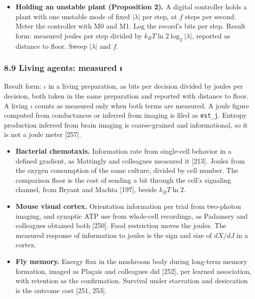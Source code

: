 \documentclass[
  10pt,
]{article}
\providecommand{\tightlist}{%
  \setlength{\itemsep}{0pt}\setlength{\parskip}{0pt}}
\begin{document}
\begin{itemize}
\begin{itemize}
    detector repeats the protocol, with \(\langle A\rangle\) counted
    jump by jump {[}70{]}. Agreement on two substrates is the test.
  \item
    All work is computed from trajectories and filed as
    \texttt{trajectory\_j}.
  \end{itemize}
\item
  \textbf{Holding an unstable plant (Proposition 2).} A digital
  controller holds a plant with one unstable mode of fixed \(|\lambda|\)
  per step, at \(f\) steps per second. Meter the controller with M0 and
  M1. Log the record's bits per step. Result form: measured joules per
  step divided by \(k_B T\ln 2\log_2|\lambda|\), reported as distance to
  floor. Sweep \(|\lambda|\) and \(f\).
\end{itemize}

\subsubsection{8.9 Living agents: measured
ι}\label{living-agents-measured-ux3b9}

Result form: \(\iota\) in a living preparation, as bits per decision
divided by joules per decision, both taken in the same preparation and
reported with distance to floor. A living \(\iota\) counts as measured
only when both terms are measured. A joule figure computed from
conductances or inferred from imaging is filed as \texttt{est\_j}.
Entropy production inferred from brain imaging is coarse-grained and
informational, so it is not a joule meter {[}257{]}.

\begin{itemize}
\tightlist
\item
  \textbf{Bacterial chemotaxis.} Information rate from single-cell
  behavior in a defined gradient, as Mattingly and colleagues measured
  it {[}213{]}. Joules from the oxygen consumption of the same culture,
  divided by cell number. The comparison floor is the cost of sending a
  bit through the cell's signaling channel, from Bryant and Machta
  {[}197{]}, beside \(k_B T\ln 2\).
\item
  \textbf{Mouse visual cortex.} Orientation information per trial from
  two-photon imaging, and synaptic ATP use from whole-cell recordings,
  as Padamsey and colleagues obtained both {[}250{]}. Food restriction
  moves the joules. The measured response of information to joules is
  the sign and size of \(dX/dJ\) in a cortex.
\item
  \textbf{Fly memory.} Energy flux in the mushroom body during long-term
  memory formation, imaged as Plaçais and colleagues did {[}252{]}, per
  learned association, with retention as the confirmation. Survival
  under starvation and desiccation is the outcome cost {[}251, 253{]}.
\end{itemize}
\end{document}
